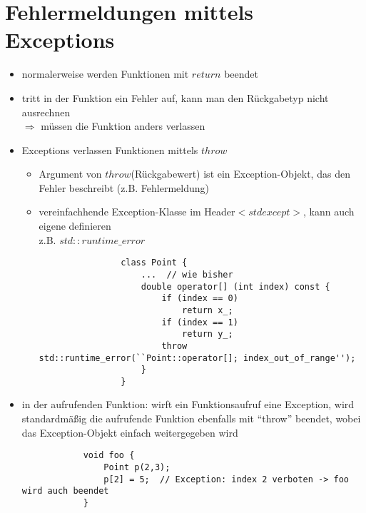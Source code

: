 \documentclass{article}
\begin{document}
\section*{Fehlermeldungen mittels Exceptions}
	\begin{itemize}
		\item normalerweise werden Funktionen mit $return$ beendet
		\item tritt in der Funktion ein Fehler auf, kann man den Rückgabetyp nicht ausrechnen \\ $\Rightarrow$ müssen die Funktion anders verlassen
		\item Exceptions verlassen Funktionen mittels $throw$
		\begin{itemize}
			\item Argument von $throw$(Rückgabewert) ist ein Exception-Objekt, das den Fehler beschreibt (z.B. Fehlermeldung)
			\item vereinfachhende Exception-Klasse im Header$<stdexcept>$, kann auch eigene definieren \\ z.B. $std::runtime \_ error$
			\begin{lstlisting}
				class Point {
					...  // wie bisher
					double operator[] (int index) const {
						if (index == 0) 
							return x_;
						if (index == 1)
							return y_;
						throw std::runtime_error(``Point::operator[]; index_out_of_range'');
					}
				}
			\end{lstlisting}
		\end{itemize}
		\item in der aufrufenden Funktion: wirft ein Funktionsaufruf eine Exception, wird standardmäßig die aufrufende Funktion ebenfalls mit ``throw'' beendet, wobei das Exception-Objekt einfach weitergegeben wird
		\begin{lstlisting}
			void foo {
				Point p(2,3);
				p[2] = 5;  // Exception: index 2 verboten -> foo wird auch beendet
			}


\end{lstlisting}
\end{itemize}
\end{document}
